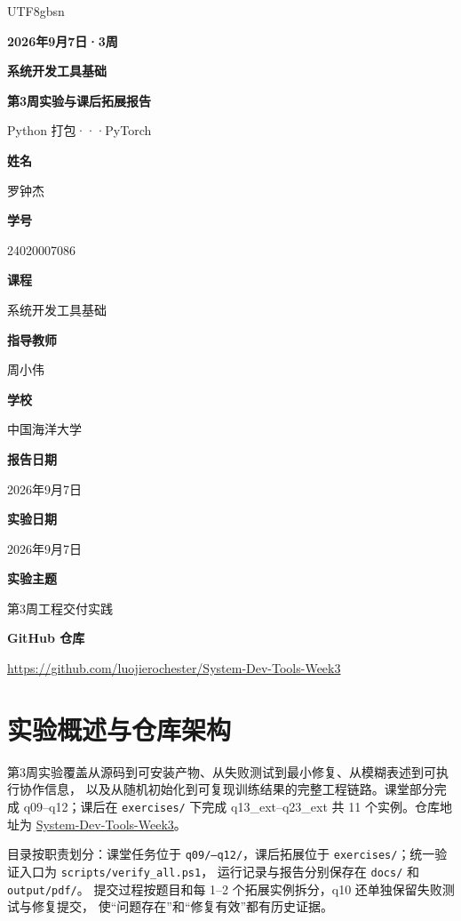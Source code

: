 \documentclass[11pt]{article}
\newcommand{\StudentName}{罗钟杰}
\newcommand{\StudentID}{24020007086}
\newcommand{\Programme}{系统开发工具基础}
\newcommand{\Institution}{中国海洋大学}
\newcommand{\InstructorName}{周小伟}
\newcommand{\ReportDate}{2026年9月7日}
\newcommand{\LabDate}{2026年9月7日}
\newcommand{\RepositoryURL}{https://github.com/luojierochester/System-Dev-Tools-Week3}
\newcommand{\CoverInfoLabel}[1]{%
  \parbox[c][9mm][c]{26mm}{\raggedright\bfseries\sffamily\color{DeepBlue}#1}}
\newcommand{\CoverInfoValueLeft}[1]{%
  \parbox[c][9mm][c]{44mm}{\raggedright\color{DeepBlue}#1}}
\newcommand{\CoverInfoLabelRight}[1]{%
  \parbox[c][9mm][c]{23mm}{\raggedright\bfseries\sffamily\color{DeepBlue}#1}}
\newcommand{\CoverInfoValueRight}[1]{%
  \parbox[c][9mm][c]{45mm}{\raggedright\color{DeepBlue}#1}}
\newcommand{\CoverInfoRow}[4]{%
  \noindent
  \CoverInfoLabel{#1}\hspace{2mm}%
  \CoverInfoValueLeft{#2}\hfill
  \CoverInfoLabelRight{#3}\hspace{2mm}%
  \CoverInfoValueRight{#4}\par}
\begin{document}
\ifPDFTeX\begin{CJK*}{UTF8}{gbsn}\fi

\thispagestyle{fancy}
\vspace*{8mm}
{\sffamily\bfseries\color{AccentBlue}\large \LabDate\quad·3周}\par
\vspace{4mm}
{\sffamily\bfseries\color{DeepBlue}\fontsize{28}{34}\selectfont
系统开发工具基础\par}
\vspace{2mm}
{\sffamily\bfseries\color{DeepBlue}\fontsize{20}{26}\selectfont
第3周实验与课后拓展报告\par}
\vspace{3mm}
{\sffamily\color{SlateGray}\fontsize{13}{19}\selectfont
Python 打包\quad·\quad·\quad·\quad PyTorch\par}
\vspace{4mm}
\noindent{\color{AccentBlue}\rule{\linewidth}{1.2pt}}
\vspace{9mm}

\begin{infobar}
\CoverInfoRow{姓名}{\StudentName}{学号}{\StudentID}
\CoverInfoRow{课程}{\Programme}{指导教师}{\InstructorName}
\CoverInfoRow{学校}{\Institution}{报告日期}{\ReportDate}
\CoverInfoRow{实验日期}{\LabDate}{实验主题}{第3周工程交付实践}
\vspace{1mm}
\noindent{\color{AccentBlue!30}\rule{\linewidth}{0.5pt}}
\vspace{1mm}
\noindent
\CoverInfoLabel{GitHub 仓库}\hspace{2mm}%
\parbox[c][9mm][c]{\dimexpr\linewidth-28mm\relax}{%
  \raggedright\href{\RepositoryURL}{\RepositoryURL}}
\end{infobar}

\clearpage
\section{实验概述与仓库架构}

第3周实验覆盖从源码到可安装产物、从失败测试到最小修复、从模糊表述到可执行协作信息，
以及从随机初始化到可复现训练结果的完整工程链路。课堂部分完成 q09--q12；课后在
\texttt{exercises/} 下完成 q13\_ext--q23\_ext 共 11 个实例。仓库地址为
\href{\RepositoryURL}{System-Dev-Tools-Week3}。

目录按职责划分：课堂任务位于 \texttt{q09/--q12/}，课后拓展位于
\texttt{exercises/}；统一验证入口为 \texttt{scripts/verify\_all.ps1}，
运行记录与报告分别保存在 \texttt{docs/} 和 \texttt{output/pdf/}。
提交过程按题目和每 1--2 个拓展实例拆分，q10 还单独保留失败测试与修复提交，
使“问题存在”和“修复有效”都有历史证据。


\end{CJK*}
\end{document}
